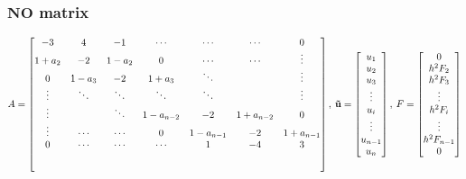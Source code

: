 \subsubsection{$\mathbf{NO}$ matrix}
\setlength{\extrarowheight}{1.25\baselineskip}
\begin{equation}
A=
\begin{bmatrix}
-3 & 4 & -1 & \cdots & \cdots & \cdots & 0\\
1+a_2 & -2 & 1-a_2 & 0 & \cdots & \cdots & \vdots\\
0 & 1-a_3 & -2 & 1+a_3 & \ddots & & \vdots\\
\vdots & \ddots & \ddots & \ddots & \ddots & & \vdots\\
\vdots & & \ddots & 1-a_{n-2} & -2 & 1+a_{n-2} & 0\\
\vdots & \cdots & \cdots & 0 & 1-a_{n-1} & -2 & 1+a_{n-1}\\
0 & \cdots & \cdots & \cdots & 1 & -4 & 3\\[5ex]
\end{bmatrix},\:
\mathbf{\vec{u}}=
\begin{bmatrix}
u_1\\
u_2\\
u_3\\
\vdots\\
u_i\\
\vdots\\
u_{n - 1}\\
u_n
\end{bmatrix},\:
F=
\begin{bmatrix}
0\\
h^2F_2\\
h^2F_3\\
\vdots\\
h^2F_i\\
\vdots\\
h^2F_{n-1}\\
0
\end{bmatrix}
\end{equation}